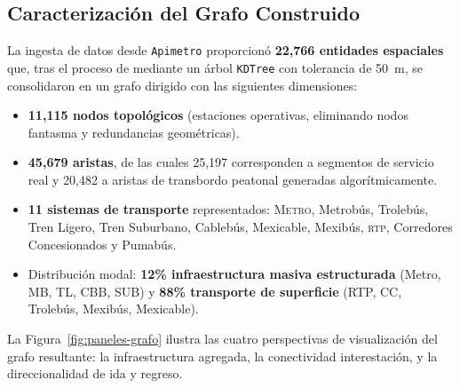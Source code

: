 \subsection{Caracterización del Grafo Construido}
\label{subsec:estadisticas-grafo}

La ingesta de datos desde \texttt{Apimetro} proporcionó \textbf{22{,}766 entidades
espaciales} que, tras el proceso de  mediante
un árbol \texttt{KDTree} con tolerancia de 50~m, se consolidaron en un grafo
dirigido con las siguientes dimensiones:

\begin{itemize}
    \item \textbf{11{,}115 nodos topológicos} (estaciones operativas, eliminando
    nodos fantasma y redundancias geométricas).
    \item \textbf{45{,}679 aristas}, de las cuales 25{,}197 corresponden a
    segmentos de servicio real y 20{,}482 a aristas de transbordo peatonal
    generadas algorítmicamente.
    \item \textbf{11 sistemas de transporte} representados: \textsc{Metro},
    Metrobús, Trolebús, Tren Ligero, Tren Suburbano, Cablebús, Mexicable,
    Mexibús, \textsc{rtp}, Corredores Concesionados y Pumabús.
    \item Distribución modal: \textbf{12\% infraestructura masiva estructurada}
    (Metro, MB, TL, CBB, SUB) y \textbf{88\% transporte de superficie}
    (RTP, CC, Trolebús, Mexibús, Mexicable).
\end{itemize}

La Figura~\ref{fig:paneles-grafo} ilustra las cuatro perspectivas de
visualización del grafo resultante: la infraestructura agregada, la conectividad
interestación, y la direccionalidad de ida y regreso.

